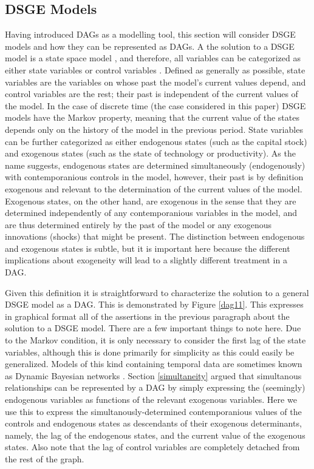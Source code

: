 \documentclass{article}
\begin{document}
\subsection{DSGE Models} \label{dsge}

Having introduced DAGs as a modelling tool, this section will consider DSGE models and how they can be represented as DAGs. A the solution to a DSGE model is a state space model \parencite{hamilton1994state}, and therefore, all variables can be categorized as either state variables or control variables \parencite{fernandez2016solution}. Defined as generally as possible, state variables are the variables on whose past the model's current values depend, and control variables are the rest; their past is independent of the current values of the model. In the case of discrete time (the case considered in this paper) DSGE models have the Markov property, meaning that the current value of the states depends only on the history of the model in the previous period. State variables can be further categorized as either endogenous states (such as the capital stock) and exogenous states (such as the state of technology or productivity). As the name suggests, endogenous states are determined simultaneously (endogenously) with contemporanious controls in the model, however, their past is by definition exogenous and relevant to the determination of the current values of the model. Exogenous states, on the other hand, are exogenous in the sense that they are determined independently of any contemporanious variables in the model, and are thus determined entirely by the past of the model or any exogenous innovations (shocks) that might be present. The distinction between endogenous and exogenous states is subtle, but it is important here because the different implications about exogeneity will lead to a slightly different treatment in a DAG.

Given this definition it is straightforward to characterize the solution to a general DSGE model as a DAG. This is demonstrated by Figure \ref{dag11}. This expresses in graphical format all of the assertions in the previous paragraph about the solution to a DSGE model. There are a few important things to note here. Due to the Markov condition, it is only necessary to consider the first lag of the state variables, although this is done primarily for simplicity as this could easily be generalized. Models of this kind containing temporal data are sometimes known as Dynamic Bayesian networks \parencite{ghahramani1997learning}. Section \ref{simultaneity} argued that simultanous relationships can be represented by a DAG by simply expressing the (seemingly) endogenous variables as functions of the relevant exogenous variables. Here we use this to express the simultanously-determined contemporanious values of the controls and endogenous states as descendants of their exogenous determinants, namely, the lag of the endogenous states, and the current value of the exogenous states. Also note that the lag of control variables are completely detached from the rest of the graph.
\end{document}
